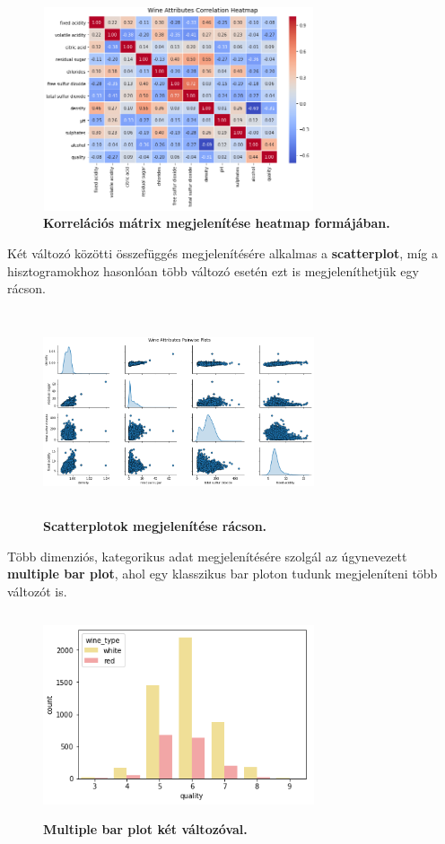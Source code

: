 \documentclass[12pt]{article}
\theoremstyle{plain}
\begin{document}
 \begin{figure}[H]
    \centering
    \includegraphics[width=8cm, height=6cm]{media/kormap.png}
    \caption{\textbf{Korrelációs mátrix megjelenítése heatmap formájában.}}
    \label{fig:GeneralDiagram}
 \end{figure}
 
 Két változó közötti összefüggés megjelenítésére alkalmas a \textbf{scatterplot}, míg a hisztogramokhoz hasonlóan több változó esetén ezt is megjeleníthetjük egy rácson.
 
 \begin{figure}[H]
    \centering
    \includegraphics[width=8cm, height=6cm]{media/pariwise.png}
    \caption{\textbf{Scatterplotok megjelenítése rácson.}}
    \label{fig:GeneralDiagram}
 \end{figure}
 
Több dimenziós, kategorikus adat megjelenítésére szolgál az úgynevezett \textbf{multiple bar plot}, ahol egy klasszikus bar ploton tudunk megjeleníteni több változót is.

\begin{figure}[H]
    \centering
    \includegraphics[width=8cm, height=6cm]{media/multiplebar.png}
    \caption{\textbf{Multiple bar plot két változóval.}}
    \label{fig:GeneralDiagram}
 \end{figure}
\end{document}
